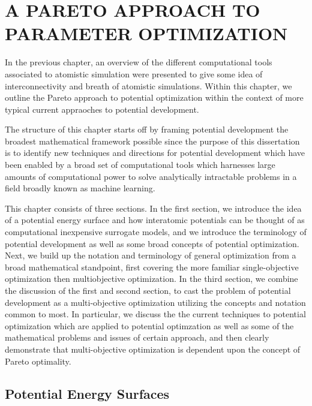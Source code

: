 \chapter{A PARETO APPROACH TO PARAMETER OPTIMIZATION}

In the previous chapter, an overview of the different computational tools associated to atomistic simulation were presented to give some idea of interconnectivity and breath of atomistic simulations.  Within this chapter, we outline the Pareto approach to potential optimization within the context of more typical current appraoches to potential development.

The structure of this chapter starts off by framing potential development the broadest mathematical framework possible since the purpose of this dissertation is to identify new techniques and directions for potential development which have been enabled by a broad set of computational tools which harnesses large amounts of computational power to solve analytically intractable problems in a field broadly known as machine learning.  

This chapter consists of three sections.  In the first section, we introduce the idea of a potential energy surface and how interatomic potentials can be thought of as computational inexpensive surrogate models, and we introduce the terminology of potential development as well as some broad concepts of potential optimization.  
Next, we build up the notation and terminology of general optimization from a broad mathematical standpoint, first covering the more familiar single-objective optimization then multiobjective optimization.
In the third section, we combine the discussion of the first and second section, to cast the problem of potential development as a multi-objective optimization utilizing the concepts and notation common to most.  
In particular, we discuss the the current techniques to potential optimization which are applied to potential optimzation as well as some of the mathematical problems and issues of certain approach, and then clearly demonstrate that multi-objective optimization is dependent upon the concept of Pareto optimality.

\section{Potential Energy Surfaces}

